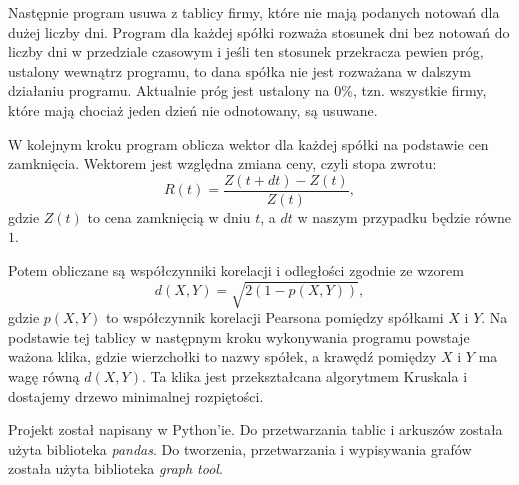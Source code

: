 \documentclass{article}
\begin{document}
Następnie program usuwa z tablicy firmy, które
nie mają podanych notowań dla dużej liczby dni.
Program dla każdej spółki rozważa stosunek dni bez notowań do
liczby dni w przedziale czasowym i jeśli ten stosunek przekracza pewien próg,
ustalony wewnątrz programu, to dana spółka nie jest rozważana w dalszym działaniu programu.
Aktualnie próg jest ustalony na $0\%$, tzn. wszystkie firmy, które mają chociaż jeden dzień
nie odnotowany, są usuwane.

W kolejnym kroku program oblicza wektor dla każdej spółki na podstawie cen zamknięcia.
Wektorem jest względna zmiana ceny, czyli stopa zwrotu:
$$ R(t) = \frac{Z(t+dt)-Z(t)}{Z(t)},$$
gdzie $Z(t)$ to cena zamknięcią w dniu $t$, a $dt$ w naszym przypadku będzie równe $1$.

Potem obliczane są współczynniki korelacji i odległości zgodnie ze wzorem
$$ d(X, Y) = \sqrt{2(1 - p(X, Y))}, $$
gdzie $p(X,Y)$ to współczynnik korelacji Pearsona pomiędzy spółkami $X$ i $Y$.
Na podstawie tej tablicy w następnym kroku wykonywania programu powstaje
ważona klika, gdzie wierzchołki to nazwy spółek, a krawędź pomiędzy $X$ i $Y$
ma wagę równą $d(X, Y)$. Ta klika jest przekształcana algorytmem Kruskala
i dostajemy drzewo minimalnej rozpiętości.

Projekt został napisany w Python'ie.
Do przetwarzania tablic i arkuszów została użyta biblioteka \textsl{pandas}.
Do tworzenia, przetwarzania i wypisywania grafów została użyta biblioteka \textsl{graph tool}.
\end{document}
